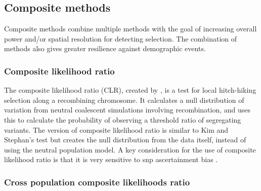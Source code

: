 \documentclass[]{report}
\begin{document}
\subsection{Composite methods}\label{composite-methods}

Composite methods combine multiple methods with the goal of increasing
overall power and/or spatial resolution for detecting selection. The
combination of methods also gives greater resilience against demographic
events.

\subsubsection{Composite likelihood
ratio}\label{composite-likelihood-ratio}

The composite likelihood ratio (CLR), created by \citet{Kim2002}, is a
test for local hitch-hiking selection along a recombining chromosome. It
calculates a null distribution of variation from neutral coalescent
simulations involving recombination, and uses this to calculate the
probability of observing a threshold ratio of segregating variants. The
\citet{Nielsen2005a} version of composite likelihood ratio is similar to
Kim and Stephan's test but creates the null distribution from the data
itself, instead of using the neutral population model. A key
consideration for the use of composite likelihood ratio is that it is
very sensitive to \gls{snp} ascertainment bias \citep{Chen2010}.

\subsubsection{Cross population composite likelihoods
ratio}\label{cross-population-composite-likelihoods-ratio}
\end{document}
